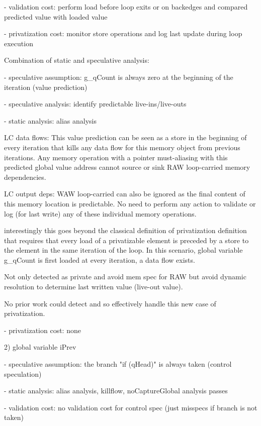 - validation cost: perform load before loop exits or on backedges and compared
  predicted value with loaded value

- privatization cost: monitor store operations and log last update during loop
  execution


Combination of static and speculative analysis:

- speculative assumption:  g\_qCount is always zero at the beginning of the
iteration (value prediction)

- speculative analysis: identify predictable live-ins/live-outs

- static analysis: alias analysis

LC data flows:
This value prediction can be seen as a store in the beginning of every
iteration that kills any data flow for this memory object from previous
iterations.  Any memory operation with a pointer must-aliasing with this
predicted global value address cannot source or sink RAW loop-carried memory
dependencies.

LC output deps: WAW loop-carried can also be ignored as the final content of this
memory location is predictable.  No need to perform any action to validate or
log (for last write) any of these individual memory operations.

interestingly this goes beyond the classical definition of privatization
definition~\cite{tu-padua-array-privatization-1994}  that requires that every
load of a privatizable element is preceded by a store to the element in the same
iteration of the loop. In this scenario, global variable g\_qCount is first
loaded at every iteration, a data flow exists.

Not only detected as private and avoid mem spec for RAW but avoid dynamic
resolution to determine last written value (live-out value).

No prior work could detect and so effectively handle this new case of
privatization.

- privatization cost: none

2) global variable iPrev

- speculative assumption: the branch "if (qHead)" is always taken (control speculation)

- static analysis: alias analysis, killflow, noCaptureGlobal analysis passes

- validation cost: no validation cost for control spec (just misspecs if branch
  is not taken)

